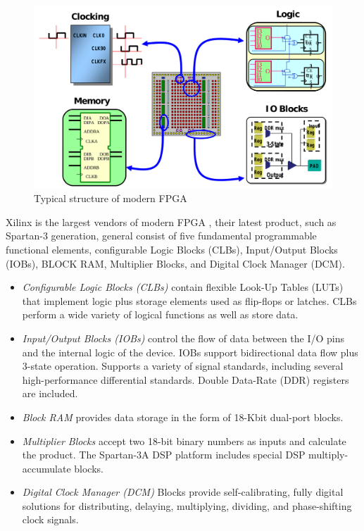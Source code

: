 \begin{figure}
  \centering
  \includegraphics[scale=0.25]{img/fpga_arch.png}
  \caption{Typical structure of modern FPGA}
  \label{fig:fpga_arch}
\end{figure}

Xilinx is the largest vendors of modern FPGA , their latest product, such
as Spartan-3 generation, general consist of five fundamental programmable
functional elements, configurable Logic Blocks (CLBs), Input/Output Blocks
(IOBs), BLOCK RAM, Multiplier Blocks, and Digital Clock Manager (DCM).

\begin{itemize}

  \item \emph{Configurable Logic Blocks (CLBs)} contain flexible Look-Up
    Tables (LUTs) that implement logic plus storage elements used as
    flip-flops or latches. CLBs perform a wide variety of logical functions
    as well as store data.

  \item \emph{Input/Output Blocks (IOBs)} control the flow of data between
    the I/O
    pins and the internal logic of the device. IOBs support bidirectional
    data flow plus 3-state operation. Supports a variety of signal
    standards, including several high-performance differential standards.
    Double Data-Rate (DDR) registers are included.

  \item \emph{Block RAM} provides data storage in the form of 18-Kbit
    dual-port
    blocks.

  \item \emph{Multiplier Blocks} accept two 18-bit binary numbers as inputs
    and
    calculate the product. The Spartan-3A DSP platform includes special DSP
    multiply-accumulate blocks.

  \item \emph{Digital Clock Manager (DCM)} Blocks provide self-calibrating,
    fully
    digital solutions for distributing, delaying, multiplying, dividing,
    and phase-shifting clock signals.
\end{itemize}

